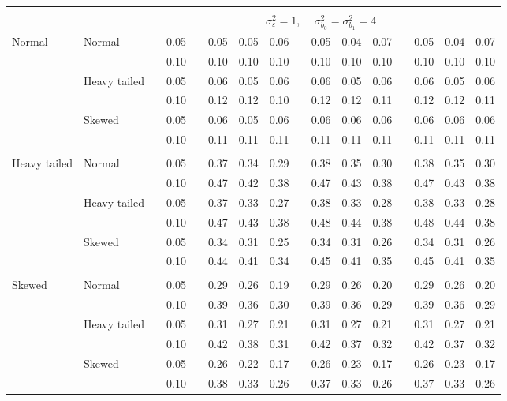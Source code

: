 \documentclass[12pt]{article} %
\begin{document}
\begin{table}[ht]
\begin{scriptsize}
\begin{center}
\begin{tabular}{ll p{.1cm} c p{.1cm} rrr p{.1cm} rrr p{.1cm} rrr}
&&&&&&&&&&&&&&&\\
& && && \multicolumn{9}{c}{$\sigma_{\varepsilon}^2 = 1$, \ \ $\sigma_{b_0}^2 = \sigma_{b_1}^2 = 4$} \\ \cline{6-16}
\rowcolor{gray!20}Normal       & Normal       && 0.05 &&   0.05 & 0.05 & 0.06 && 0.05 & 0.04 & 0.07 && 0.05 & 0.04 & 0.07 \\ 
\rowcolor{gray!20}             &              && 0.10 &&   0.10 & 0.10 & 0.10 && 0.10 & 0.10 & 0.10 && 0.10 & 0.10 & 0.10 \\ 
\rowcolor{gray!20}             & Heavy tailed && 0.05 &&   0.06 & 0.05 & 0.06 && 0.06 & 0.05 & 0.06 && 0.06 & 0.05 & 0.06 \\ 
\rowcolor{gray!20}             &              && 0.10 &&   0.12 & 0.12 & 0.10 && 0.12 & 0.12 & 0.11 && 0.12 & 0.12 & 0.11 \\ 
\rowcolor{gray!20}             & Skewed       && 0.05 &&   0.06 & 0.05 & 0.06 && 0.06 & 0.06 & 0.06 && 0.06 & 0.06 & 0.06 \\ 
\rowcolor{gray!20}             &              && 0.10 &&   0.11 & 0.11 & 0.11 && 0.11 & 0.11 & 0.11 && 0.11 & 0.11 & 0.11 \\ 
             &&&&&&&&&&&&&&&\\
Heavy tailed & Normal       && 0.05 &&   0.37 & 0.34 & 0.29 && 0.38 & 0.35 & 0.30 && 0.38 & 0.35 & 0.30 \\ 
             &              && 0.10 &&   0.47 & 0.42 & 0.38 && 0.47 & 0.43 & 0.38 && 0.47 & 0.43 & 0.38 \\ 
             & Heavy tailed && 0.05 &&   0.37 & 0.33 & 0.27 && 0.38 & 0.33 & 0.28 && 0.38 & 0.33 & 0.28 \\ 
             &              && 0.10 &&   0.47 & 0.43 & 0.38 && 0.48 & 0.44 & 0.38 && 0.48 & 0.44 & 0.38 \\ 
             & Skewed       && 0.05 &&   0.34 & 0.31 & 0.25 && 0.34 & 0.31 & 0.26 && 0.34 & 0.31 & 0.26 \\ 
             &              && 0.10 &&   0.44 & 0.41 & 0.34 && 0.45 & 0.41 & 0.35 && 0.45 & 0.41 & 0.35 \\ 
             &&&&&&&&&&&&&&&\\
Skewed       & Normal       && 0.05 &&   0.29 & 0.26 & 0.19 && 0.29 & 0.26 & 0.20 && 0.29 & 0.26 & 0.20 \\ 
             &              && 0.10 &&   0.39 & 0.36 & 0.30 && 0.39 & 0.36 & 0.29 && 0.39 & 0.36 & 0.29 \\ 
             & Heavy tailed && 0.05 &&   0.31 & 0.27 & 0.21 && 0.31 & 0.27 & 0.21 && 0.31 & 0.27 & 0.21 \\ 
             &              && 0.10 &&   0.42 & 0.38 & 0.31 && 0.42 & 0.37 & 0.32 && 0.42 & 0.37 & 0.32 \\ 
             & Skewed       && 0.05 &&   0.26 & 0.22 & 0.17 && 0.26 & 0.23 & 0.17 && 0.26 & 0.23 & 0.17 \\ 
             &              && 0.10 &&   0.38 & 0.33 & 0.26 && 0.37 & 0.33 & 0.26 && 0.37 & 0.33 & 0.26 \\ 



\end{tabular}
\end{center}
\end{scriptsize}
\end{table}
\end{document}
